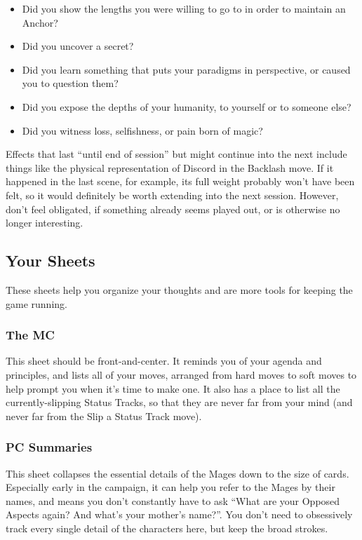 \documentclass[
]{article}
\begin{document}
\begin{itemize}
\item
  Did you show the lengths you were willing to go to in order to
  maintain an Anchor?
\item
  Did you uncover a secret?
\item
  Did you learn something that puts your paradigms in perspective, or
  caused you to question them?
\item
  Did you expose the depths of your humanity, to yourself or to someone
  else?
\item
  Did you witness loss, selfishness, or pain born of magic?
\end{itemize}

Effects that last ``until end of session'' but might continue into the
next include things like the physical representation of Discord in the
Backlash move. If it happened in the last scene, for example, its full
weight probably won't have been felt, so it would definitely be worth
extending into the next session. However, don't feel obligated, if
something already seems played out, or is otherwise no longer
interesting.

\hypertarget{your-sheets}{%
\subsection{Your Sheets}\label{your-sheets}}

These sheets help you organize your thoughts and are more tools for
keeping the game running.

\hypertarget{the-mc}{%
\subsubsection{The MC}\label{the-mc}}

This sheet should be front-and-center. It reminds you of your agenda and
principles, and lists all of your moves, arranged from hard moves to
soft moves to help prompt you when it's time to make one. It also has a
place to list all the currently-slipping Status Tracks, so that they are
never far from your mind (and never far from the Slip a Status Track
move).

\hypertarget{pc-summaries}{%
\subsubsection{PC Summaries}\label{pc-summaries}}

This sheet collapses the essential details of the Mages down to the size
of cards. Especially early in the campaign, it can help you refer to the
Mages by their names, and means you don't constantly have to ask ``What
are your Opposed Aspects again? And what's your mother's name?''. You
don't need to obsessively track every single detail of the characters
here, but keep the broad strokes.
\end{document}
